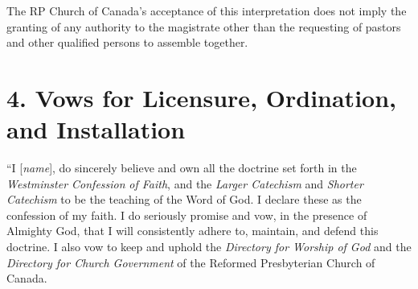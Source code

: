 \par The RP Church of Canada's acceptance of this interpretation does not imply the granting of any authority to the magistrate other than the requesting of pastors and other qualified persons to assemble together.     

\section[4. Vows for Licensure, Ordination, and Installation]{4. Vows for Licensure, Ordination, and Installation} 

\par {``I [}\textit{name}], do sincerely believe and own all the doctrine set forth in the \textit{Westminster Confession}\textit{ of Faith}, and the \textit{Larger Catechism} and \textit{Shorter Catechism} to be the teaching of the Word of God. I declare these as the confession of my faith. I do seriously promise and vow, in the presence of Almighty God, that I will consistently adhere to, maintain, and defend this doctrine. I also vow to keep and uphold the \textit{Directory for Worship of God} and the \textit{Directory for Church Government} of the Reformed Presbyterian Church of Canada.

